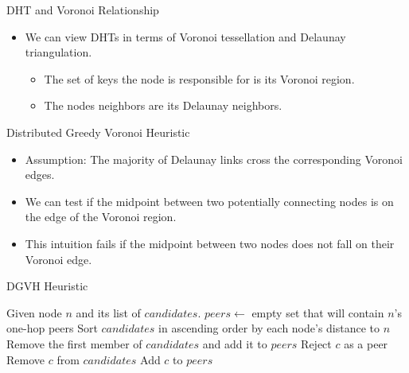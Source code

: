 \documentclass[11pt]{beamer}
\begin{document}
\begin{frame}{DHT and Voronoi Relationship }
	\begin{itemize}
		\item We can view DHTs in terms of Voronoi tessellation and Delaunay triangulation.
		\begin{itemize}
			\item The set of keys the node is responsible for is its Voronoi region.
			\item The nodes neighbors are its Delaunay neighbors.
		\end{itemize}
	\end{itemize}
\end{frame}



\begin{frame}{Distributed Greedy Voronoi Heuristic}
	
	\begin{itemize}
		\item Assumption: The majority of Delaunay links cross the corresponding Voronoi edges.
		\item We can test if the midpoint between two potentially connecting nodes is on the edge of the Voronoi region.
		\item This intuition fails if the midpoint between two nodes does not fall on their Voronoi edge.
	\end{itemize}
	
\end{frame}

\begin{frame}{DGVH Heuristic}
	
	\begin{algorithmic}[1]  %
		\STATE Given node $n$ and its list of $candidates$.
		\STATE $peers \leftarrow$ empty set that will contain $n$'s one-hop peers
		\STATE Sort $candidates$ in ascending order by each node's distance to $n$
		\STATE Remove the first member of $candidates$ and add it to $peers$
		\STATE Reject $c$ as a peer
		\ELSE
		\STATE Remove $c$ from $candidates$
		\STATE Add $c$ to $peers$
		\ENDIF
		\ENDFOR
	\end{algorithmic}
	
\end{frame}
\end{document}

